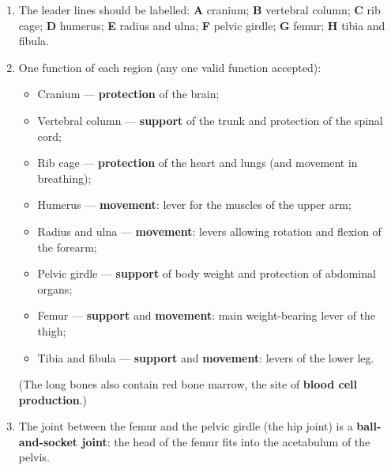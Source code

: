 \documentclass[11pt]{article}
\begin{document}
\begin{corrige}
\begin{enumerate}
\item The leader lines should be labelled: \textbf{A} cranium; \textbf{B} vertebral column; \textbf{C} rib cage; \textbf{D} humerus; \textbf{E} radius and ulna; \textbf{F} pelvic girdle; \textbf{G} femur; \textbf{H} tibia and fibula.
\item One function of each region (any one valid function accepted):
\begin{itemize}
\item Cranium — \textbf{protection} of the brain;
\item Vertebral column — \textbf{support} of the trunk and protection of the spinal cord;
\item Rib cage — \textbf{protection} of the heart and lungs (and movement in breathing);
\item Humerus — \textbf{movement}: lever for the muscles of the upper arm;
\item Radius and ulna — \textbf{movement}: levers allowing rotation and flexion of the forearm;
\item Pelvic girdle — \textbf{support} of body weight and protection of abdominal organs;
\item Femur — \textbf{support} and \textbf{movement}: main weight-bearing lever of the thigh;
\item Tibia and fibula — \textbf{support} and \textbf{movement}: levers of the lower leg.
\end{itemize}
(The long bones also contain red bone marrow, the site of \textbf{blood cell production}.)
\item The joint between the femur and the pelvic girdle (the hip joint) is a \textbf{ball-and-socket joint}: the head of the femur fits into the acetabulum of the pelvis.
\end{enumerate}
\end{corrige}
\end{document}
